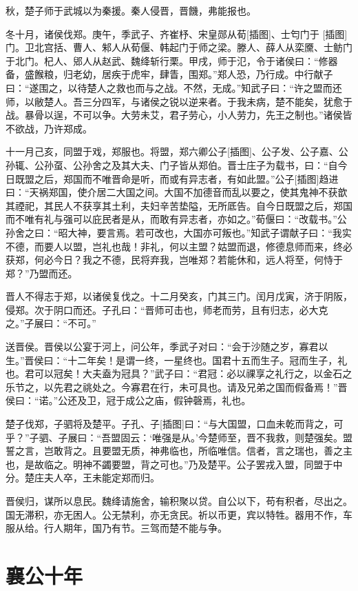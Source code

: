 \documentclass[a4paper,12pt,UTF8,twoside]{ctexbook}
\begin{document}
秋，楚子师于武城以为秦援。秦人侵晋，晋饑，弗能报也。

冬十月，诸侯伐郑。庚午，季武子、齐崔杼、宋皇郧从荀[插图]、士匄门于 [插图]门。卫北宫括、曹人、邾人从荀偃、韩起门于师之梁。滕人、薛人从栾黡、士鲂门于北门。杞人、郳人从赵武、魏绛斩行栗。甲戌，师于氾，令于诸侯曰：“修器备，盛餱粮，归老幼，居疾于虎牢，肆眚，围郑。”郑人恐，乃行成。中行献子曰：“遂围之，以待楚人之救也而与之战。不然，无成。”知武子曰：“许之盟而还师，以敝楚人。吾三分四军，与诸侯之锐以逆来者。于我未病，楚不能矣，犹愈于战。暴骨以逞，不可以争。大劳未艾，君子劳心，小人劳力，先王之制也。”诸侯皆不欲战，乃许郑成。

十一月己亥，同盟于戏，郑服也。将盟，郑六卿公子[插图]、公子发、公子嘉、公孙辄、公孙虿、公孙舍之及其大夫、门子皆从郑伯。晋士庄子为载书，曰：“自今日既盟之后，郑国而不唯晋命是听，而或有异志者，有如此盟。”公子[插图]趋进曰：“天祸郑国，使介居二大国之间。大国不加德音而乱以要之，使其鬼神不获歆其禋祀，其民人不获享其土利，夫妇辛苦垫隘，无所厎告。自今日既盟之后，郑国而不唯有礼与强可以庇民者是从，而敢有异志者，亦如之。”荀偃曰：“改载书。”公孙舍之曰：“昭大神，要言焉。若可改也，大国亦可叛也。”知武子谓献子曰：“我实不德，而要人以盟，岂礼也哉！非礼，何以主盟？姑盟而退，修德息师而来，终必获郑，何必今日？我之不德，民将弃我，岂唯郑？若能休和，远人将至，何恃于郑？”乃盟而还。

晋人不得志于郑，以诸侯复伐之。十二月癸亥，门其三门。闰月戊寅，济于阴阪，侵郑。次于阴口而还。子孔曰：“晋师可击也，师老而劳，且有归志，必大克之。”子展曰：“不可。”

送晋侯。晋侯以公宴于河上，问公年，季武子对曰：“会于沙随之岁，寡君以生。”晋侯曰：“十二年矣！是谓一终，一星终也。国君十五而生子。冠而生子，礼也。君可以冠矣！大夫盍为冠具？”武子曰：“君冠：必以祼享之礼行之，以金石之乐节之，以先君之祧处之。今寡君在行，未可具也。请及兄弟之国而假备焉！”晋侯曰：“诺。”公还及卫，冠于成公之庙，假钟磬焉，礼也。

楚子伐郑，子驷将及楚平。子孔、子[插图]曰：“与大国盟，口血未乾而背之，可乎？”子驷、子展曰：“吾盟固云：‘唯强是从。’今楚师至，晋不我救，则楚强矣。盟誓之言，岂敢背之。且要盟无质，神弗临也，所临唯信。信者，言之瑞也，善之主也，是故临之。明神不蠲要盟，背之可也。”乃及楚平。公子罢戎入盟，同盟于中分。楚庄夫人卒，王未能定郑而归。

晋侯归，谋所以息民。魏绛请施舍，输积聚以贷。自公以下，苟有积者，尽出之。国无滞积，亦无困人。公无禁利，亦无贪民。祈以币更，宾以特牲。器用不作，车服从给。行人期年，国乃有节。三驾而楚不能与争。

\chapter{襄公十年}
\end{document}
